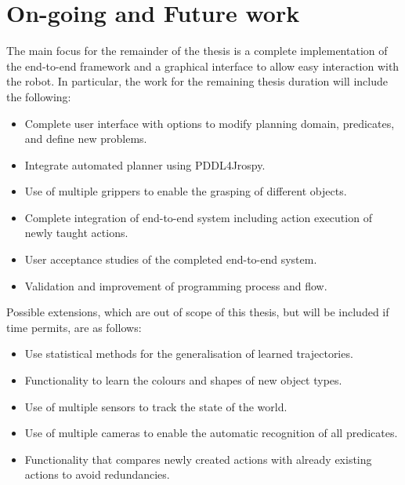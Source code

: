 \section{On-going and Future work}
The main focus for the remainder of the thesis is a complete implementation of the end-to-end framework and a graphical interface to allow easy interaction with the robot. In particular, the work for the remaining thesis duration will include the following:
\begin{itemize}
\item Complete user interface with options to modify planning domain, predicates, and define new problems.
\item Integrate automated planner using PDDL4Jrospy.
\item Use of multiple grippers to enable the grasping of different objects.
\item Complete integration of end-to-end system including action execution of newly taught actions.
\item User acceptance studies of the completed end-to-end system.
\item Validation and improvement of programming process and flow.
\end{itemize}

Possible extensions, which are out of scope of this thesis, but will be included if time permits, are as follows:
\begin{itemize}
	\item Use statistical methods for the generalisation of learned trajectories.
	\item Functionality to learn the colours and shapes of new object types.
	\item Use of multiple sensors to track the state of the world.
	\item Use of multiple cameras to enable the automatic recognition of all predicates.
	\item Functionality that compares newly created actions with already existing actions to avoid redundancies.
\end{itemize}